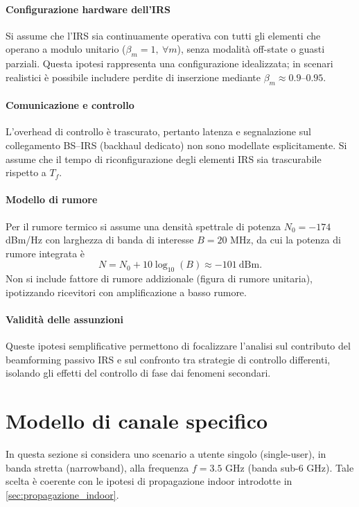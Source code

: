 \documentclass[12pt,a4paper]{report}
\begin{document}
\paragraph{Configurazione hardware dell'IRS}
Si assume che l'IRS sia continuamente operativa con tutti gli elementi
che operano a modulo unitario ($\beta_m=1,\ \forall m$), senza
modalità off-state o guasti parziali. Questa ipotesi rappresenta
una configurazione idealizzata; in scenari realistici è possibile
includere perdite di inserzione mediante $\beta_m \approx 0.9$--$0.95$.

\paragraph{Comunicazione e controllo}
L'overhead di controllo è trascurato, pertanto latenza e segnalazione
sul collegamento BS--IRS (backhaul dedicato) non sono modellate
esplicitamente. Si assume che il tempo di riconfigurazione degli
elementi IRS sia trascurabile rispetto a $T_f$.

\paragraph{Modello di rumore}
Per il rumore termico si assume una densità spettrale di potenza
$N_0=-174$ dBm/Hz con larghezza di banda di interesse $B=20$ MHz,
da cui la potenza di rumore integrata è
\begin{equation}
  N = N_0 + 10\log_{10}(B) \approx -101\ \text{dBm}.
\end{equation}
Non si include fattore di rumore addizionale (figura di rumore
unitaria), ipotizzando ricevitori con amplificazione a basso rumore.

\paragraph{Validità delle assunzioni}
Queste ipotesi semplificative permettono di focalizzare l'analisi sul
contributo del beamforming passivo IRS e sul confronto tra strategie
di controllo differenti, isolando gli effetti del controllo di fase
dai fenomeni secondari.

\section{Modello di canale specifico}
In questa sezione si considera uno scenario a utente singolo
(single-user), in banda stretta (narrowband), alla
frequenza $f = 3.5$ GHz (banda sub-6 GHz). Tale scelta è coerente con
le ipotesi di propagazione indoor introdotte in
\cref{sec:propagazione_indoor}.
\end{document}

